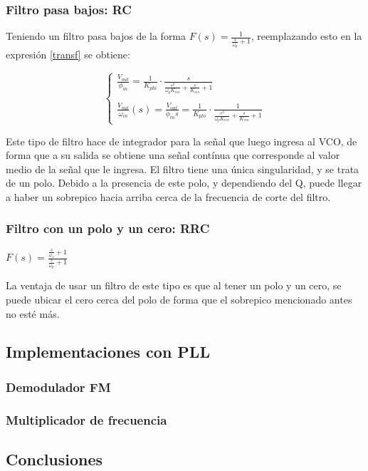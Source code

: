 	\subsubsection{Filtro pasa bajos: RC}
	
	Teniendo un filtro pasa bajos de la forma $F(s) = \frac{1}{\frac{s}{\omega_p} + 1}$, reemplazando esto en la expresi\'on \ref{transf} se obtiene:
	
	\begin{equation}
	\begin{cases}
	\frac{V_{out}}{\phi_{in}} = \frac{1}{K_{phi}}\cdot \frac{s}{\frac{s^2}{\omega_p K_{vco}}+\frac{s}{K_{vco}} + 1}\\ \\
	\frac{V_{out}}{\omega_{in}} (s)=\frac{V_{out}}{\phi_{in}s} = \frac{1}{K_{phi}}\cdot \frac{1}{\frac{s^2}{\omega_p K_{vco}}+\frac{s}{K_{vco}} + 1}
	\end{cases}
	\label{transf2}
	\end{equation}
	
	Este tipo de filtro hace de integrador para la señal que luego ingresa al VCO, de forma que a su salida se obtiene una señal cont\'inua que corresponde al valor medio de la señal que le ingresa. El filtro tiene una \'unica singularidad, y se trata de un polo. Debido a la presencia de este polo, y dependiendo del Q, puede llegar a haber un sobrepico hacia arriba cerca de la frecuencia de corte del filtro.
	
	\subsubsection{Filtro con un polo y un cero: RRC}
	$F(s) = \frac{\frac{s}{\omega_z} + 1}{\frac{s}{\omega_p} + 1}$
	
	La ventaja de usar un filtro de este tipo es que al tener un polo y un cero, se puede ubicar el cero cerca del polo de forma que el sobrepico mencionado antes no est\'e m\'as.

\subsection{Implementaciones con PLL}

	\subsubsection{Demodulador FM }
	
	\subsubsection{Multiplicador de frecuencia}

\subsection{Conclusiones}